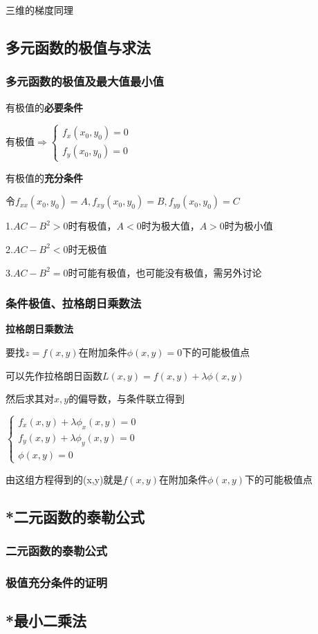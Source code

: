 \documentclass{article} %
\begin{document}
三维的梯度同理

\subsection{多元函数的极值与求法}
\subsubsection{多元函数的极值及最大值最小值}
有极值的\textbf{必要条件}\par
\hspace{5mm}有极值$\Rightarrow \left\{\begin{array}{l}f_x(x_0,y_0)=0\\f_y(x_0,y_0)=0\end{array}\right.$\par
有极值的\textbf{充分条件}\par
\hspace{5mm}令$f_{xx}(x_0,y_0)=A,f_{xy}(x_0,y_0)=B,f_{yy}(x_0,y_0)=C$\par
\hspace{5mm}1.$AC-B^2>0$时有极值，$A<0$时为极大值，$A>0$时为极小值\par
\hspace{5mm}2.$AC-B^2<0$时无极值\par
\hspace{5mm}3.$AC-B^2=0$时可能有极值，也可能没有极值，需另外讨论\par

\subsubsection{条件极值、拉格朗日乘数法}
\textbf{拉格朗日乘数法}\par
\hspace{5mm}要找$z=f(x,y)$在附加条件$\phi(x,y)=0$下的可能极值点\par
\hspace{5mm}可以先作拉格朗日函数$L(x,y)=f(x,y)+\lambda\phi(x,y)$\par
\hspace{5mm}然后求其对$x,y$的偏导数，与条件联立得到\par
\hspace{5mm}$\left\{\begin{array}{ll}
        f_x(x,y)+\lambda\phi_x(x,y)=0\\
        f_y(x,y)+\lambda\phi_y(x,y)=0\\
        \phi(x,y)=0
    \end{array}\right.$\par
\hspace{5mm}由这组方程得到的(x,y)就是$f(x,y)$在附加条件$\phi(x,y)$下的可能极值点

\subsection{*二元函数的泰勒公式}
\subsubsection{二元函数的泰勒公式}
\subsubsection{极值充分条件的证明}

\subsection{*最小二乘法}
\end{document}
